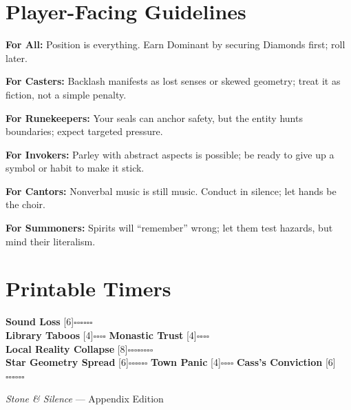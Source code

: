 \documentclass[11pt]{article}
\newcommand{\Clock}[2]{\textbf{#1} [#2]}
\begin{document}
\section{Player-Facing Guidelines}
\label{app:player}
\textbf{For All:} Position is everything. Earn Dominant by securing Diamonds first; roll later.

\medskip
\textbf{For Casters:} Backlash manifests as lost senses or skewed geometry; treat it as fiction, not a simple penalty.

\medskip
\textbf{For Runekeepers:} Your seals can anchor safety, but the entity hunts boundaries; expect targeted pressure.

\medskip
\textbf{For Invokers:} Parley with abstract aspects is possible; be ready to give up a symbol or habit to make it stick.

\medskip
\textbf{For Cantors:} Nonverbal music is still music. Conduct in silence; let hands be the choir.

\medskip
\textbf{For Summoners:} Spirits will ``remember'' wrong; let them test hazards, but mind their literalism.

\section{Printable Timers}
\label{app:timers}
\begin{tcolorbox}[breakable]
\Clock{Sound Loss}{6}\hfill\(\square\square\square\square\square\square\)\\[3pt]
\Clock{Library Taboos}{4}\hfill\(\square\square\square\square\)\quad
\Clock{Monastic Trust}{4}\hfill\(\square\square\square\square\)\\[3pt]
\Clock{Local Reality Collapse}{8}\hfill\(\square\square\square\square\square\square\square\square\)\\[3pt]
\Clock{Star Geometry Spread}{6}\hfill\(\square\square\square\square\square\square\)\quad
\Clock{Town Panic}{4}\hfill\(\square\square\square\square\)\quad
\Clock{Cass's Conviction}{6}\hfill\(\square\square\square\square\square\square\)
\end{tcolorbox}

\vfill
\begin{center}
\small{\emph{Stone \& Silence} --- Appendix Edition}
\end{center}
\end{document}
